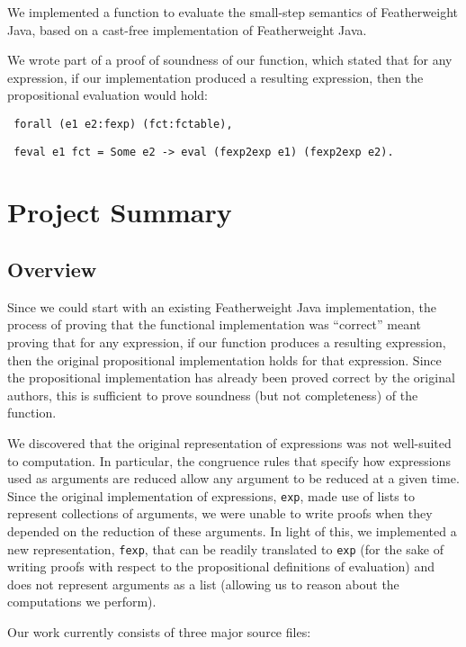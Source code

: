 \documentclass{article}
\begin{document}
We implemented a function to evaluate the small-step semantics of Featherweight Java, based on a cast-free implementation of Featherweight Java\cite{castfree}.

We wrote part of a proof of soundness of our function, which stated that for any expression, if our implementation produced a resulting expression, then the propositional evaluation would hold:

\texttt{
forall (e1 e2:fexp) (fct:fctable),
}

\texttt{
    feval e1 fct = Some e2 -> eval (fexp2exp e1) (fexp2exp e2).
}

\section{Project Summary}

\subsection{Overview}

Since we could start with an existing Featherweight Java implementation, the process of proving that the functional implementation was ``correct'' meant proving that for any expression, if our function produces a resulting expression, then the original propositional implementation holds for that expression.  Since the propositional implementation has already been proved correct by the original authors, this is sufficient to prove soundness (but not completeness) of the function.

We discovered that the original representation of expressions was not well-suited to computation. In particular, the congruence rules that specify how expressions used as arguments are reduced allow any argument to be reduced at a given time. Since the original implementation of expressions, \texttt{exp}, made use of lists to represent collections of arguments, we were unable to write proofs when they depended on the reduction of these arguments. In light of this, we implemented a new representation, \texttt{fexp}, that can be readily translated to \texttt{exp} (for the sake of writing proofs with respect to the propositional definitions of evaluation) and does not represent arguments as a list (allowing us to reason about the computations we perform).

Our work currently consists of three major source files:
\end{document}
